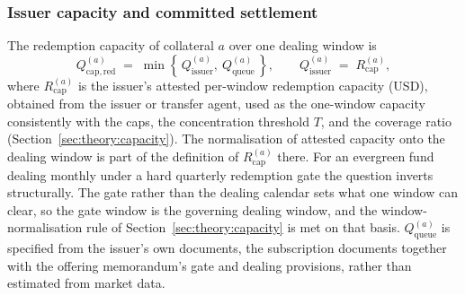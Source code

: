 \subsubsection{Issuer capacity and committed settlement}
The redemption capacity of collateral $a$ over one dealing window is
\begin{equation}\label{eq:qcapred}
Q_{\mathrm{cap,red}}^{(a)} \;=\; \min\!\left\{\, Q_{\mathrm{issuer}}^{(a)},\ Q_{\mathrm{queue}}^{(a)} \,\right\},
\qquad
Q_{\mathrm{issuer}}^{(a)} \;=\; R_{\mathrm{cap}}^{(a)},
\end{equation}
where $R_{\mathrm{cap}}^{(a)}$ is the issuer's attested per-window redemption capacity
(USD), obtained from the issuer or transfer agent, used as the one-window
capacity consistently with the caps, the concentration threshold $T$, and the coverage
ratio (Section~\ref{sec:theory:capacity}). The normalisation of attested capacity onto
the dealing window is part of the definition of $R_{\mathrm{cap}}^{(a)}$ there. For an
evergreen fund dealing monthly under a hard quarterly redemption gate the question
inverts structurally. The gate rather than the dealing calendar sets what one window can clear, so the gate window is the governing dealing window, and the window-normalisation rule of Section~\ref{sec:theory:capacity} is met on that basis. $Q_{\mathrm{queue}}^{(a)}$ is specified from the issuer's own documents, the subscription documents together with the offering memorandum's gate and dealing provisions, rather than estimated
from market data.

